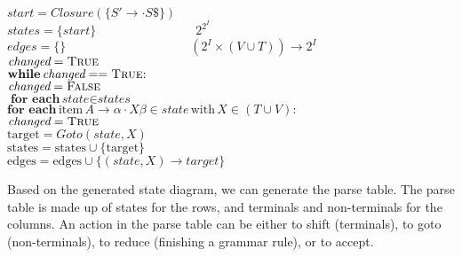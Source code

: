 \documentclass{article}
\begin{document}
	\-\hspace{1em} $\textit{start} = \textit{Closure}(\{S' \rightarrow \cdot S \$\})$\\
	\-\hspace{1em} $\textit{states} = \{ \textit{start} \} \hspace{8em} 2^{2^I}$\\
	\-\hspace{1em} $\textit{edges} = \{\} \hspace{10em} (2^I \times (V \cup T)) \rightarrow 2^I$\\
	\-\hspace{1em} $\textit{changed} = \textsc{True}$\\
	\-\hspace{1em} $\textbf{while} \, \textit{changed} == \textsc{True} \textrm{:}$\\
	\-\hspace{2em} $\textit{changed} = \textsc{False}$\\
	\-\hspace{2em} $\textbf{for each} \, \textit{state} \in \textit{states}$\\
	\-\hspace{3em} $\textbf{for each} \, \textrm{item} \, A \rightarrow \alpha \cdot X \beta \in \textit{state} \, \textrm{with} \, X \in (T \cup V) \textrm{:}$\\
	\-\hspace{4em} $\textit{changed} = \textsc{True}$\\
	\-\hspace{4em} $\textrm{target} = \textit{Goto}(\textit{state}, X)$\\
	\-\hspace{4em} $\textrm{states} = \textrm{states} \cup \{\textrm{target}\}$\\
	\-\hspace{4em} $\textrm{edges} = \textrm{edges} \cup \{(\textit{state}, X) \rightarrow \textit{target}\}$
	
	 Based on the generated state diagram, we can generate the parse table.
	 The parse table is made up of states for the rows, and	terminals and non-terminals for the columns.
	 An action in the parse table can be either to shift (terminals), to goto (non-terminals), to reduce (finishing a grammar rule), or to accept.
	 
\end{document}
